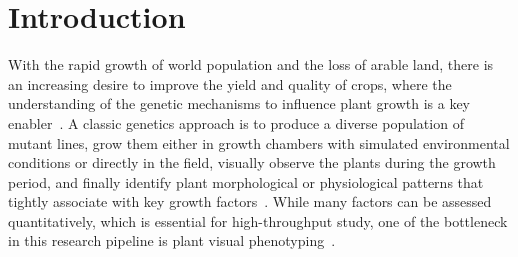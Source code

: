 \section{Introduction}
\label{sec:intro}

With the rapid growth of world population and the loss of arable land, there is an increasing desire to improve the yield and quality of crops, where the understanding of the genetic mechanisms to influence plant growth is a key enabler~\cite{doos2002population}.
%
A classic genetics approach is to produce a diverse population of mutant lines, grow them either in growth chambers with simulated environmental conditions or directly in the field, visually observe the plants during the growth period, and finally identify plant morphological or physiological patterns that tightly associate with key growth factors~\cite{houle2010phenomics}.
%
While many factors can be assessed quantitatively, which is essential for high-throughput study, one of the bottleneck in this research pipeline is plant visual phenotyping~\cite{walter2015plant}.

